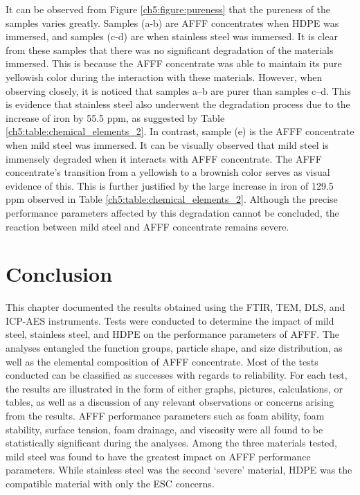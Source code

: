 \documentclass[12pt]{report}
\begin{document}
It can be observed from Figure \ref{ch5:figure:pureness} that the pureness of the samples varies greatly. Samples (a-b) are AFFF concentrates when HDPE was immersed, and samples (c-d) are when stainless steel was immersed. It is clear from these samples that there was no significant degradation of the materials immersed. This is because the AFFF concentrate was able to maintain its pure yellowish color during the interaction with these materials. However, when observing closely, it is noticed that samples a–b are purer than samples c–d. This is evidence that stainless steel also underwent the degradation process due to the increase of iron by 55.5 ppm, as suggested by Table \ref{ch5:table:chemical_elements_2}. In contrast, sample (e) is the AFFF concentrate when mild steel was immersed. It can be visually observed that mild steel is immensely degraded when it interacts with AFFF concentrate. The AFFF concentrate's transition from a yellowish to a brownish color serves as visual evidence of this. This is further justified by the large increase in iron of 129.5 ppm observed in Table \ref{ch5:table:chemical_elements_2}. Although the precise performance parameters affected by this degradation cannot be concluded, the reaction between mild steel and AFFF concentrate remains severe.

\section{Conclusion}
This chapter documented the results obtained using the FTIR, TEM, DLS, and ICP-AES instruments. Tests were conducted to determine the impact of mild steel, stainless steel, and HDPE on the performance parameters of AFFF. The analyses entangled the function groups, particle shape, and size distribution, as well as the elemental composition of AFFF concentrate. Most of the tests conducted can be classified as successes with regards to reliability. For each test, the results are illustrated in the form of either graphs, pictures, calculations, or tables, as well as a discussion of any relevant observations or concerns arising from the results. AFFF performance parameters such as foam ability, foam stability, surface tension, foam drainage, and viscosity were all found to be statistically significant during the analyses. Among the three materials tested, mild steel was found to have the greatest impact on AFFF performance parameters. While stainless steel was the second ‘severe’ material, HDPE was the compatible material with only the ESC concerns.
  
\end{document}

